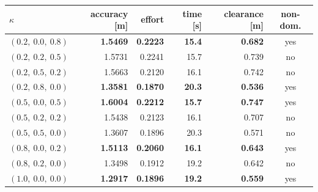 \begin{tabular}{lrrrrc}
  \toprule
  $\kappa$ & accuracy [m] & effort & time [s] & clearance [m] & non-dom. \\
  \midrule
  $(0.2,\ 0.0,\ 0.8)$ & \textbf{1.5469} & \textbf{0.2223} & \textbf{15.4} & \textbf{0.682} & yes \\
  $(0.2,\ 0.2,\ 0.5)$ & 1.5731 & 0.2241 & 15.7 & 0.739 & no \\
  $(0.2,\ 0.5,\ 0.2)$ & 1.5663 & 0.2120 & 16.1 & 0.742 & no \\
  $(0.2,\ 0.8,\ 0.0)$ & \textbf{1.3581} & \textbf{0.1870} & \textbf{20.3} & \textbf{0.536} & yes \\
  $(0.5,\ 0.0,\ 0.5)$ & \textbf{1.6004} & \textbf{0.2212} & \textbf{15.7} & \textbf{0.747} & yes \\
  $(0.5,\ 0.2,\ 0.2)$ & 1.5438 & 0.2123 & 16.1 & 0.707 & no \\
  $(0.5,\ 0.5,\ 0.0)$ & 1.3607 & 0.1896 & 20.3 & 0.571 & no \\
  $(0.8,\ 0.0,\ 0.2)$ & \textbf{1.5113} & \textbf{0.2060} & \textbf{16.1} & \textbf{0.643} & yes \\
  $(0.8,\ 0.2,\ 0.0)$ & 1.3498 & 0.1912 & 19.2 & 0.642 & no \\
  $(1.0,\ 0.0,\ 0.0)$ & \textbf{1.2917} & \textbf{0.1896} & \textbf{19.2} & \textbf{0.559} & yes \\
  \bottomrule
\end{tabular}
